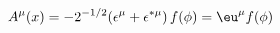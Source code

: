 \begin{equation}
A^\mu(x)=-2^{-1/2}(\epsilon^\mu+\epsilon^{*\mu})\,f(\phi)
=\eu^\mu f(\phi)
\end{equation}

